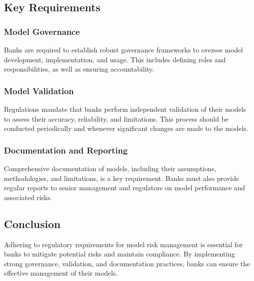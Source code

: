 \subsection{Key Requirements}
\subsubsection{Model Governance}
Banks are required to establish robust governance frameworks to oversee model development, implementation, and usage. This includes defining roles and responsibilities, as well as ensuring accountability.

\subsubsection{Model Validation}
Regulations mandate that banks perform independent validation of their models to assess their accuracy, reliability, and limitations. This process should be conducted periodically and whenever significant changes are made to the models.

\subsubsection{Documentation and Reporting}
Comprehensive documentation of models, including their assumptions, methodologies, and limitations, is a key requirement. Banks must also provide regular reports to senior management and regulators on model performance and associated risks.

\subsection{Conclusion}
Adhering to regulatory requirements for model risk management is essential for banks to mitigate potential risks and maintain compliance. By implementing strong governance, validation, and documentation practices, banks can ensure the effective management of their models.